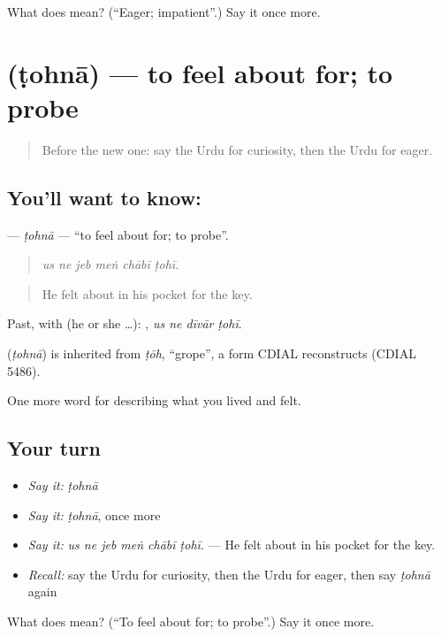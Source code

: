 \begin{tcolorbox}[breakable,colback=teal!4,colframe=teal!35!black,title={Before you move on}]
What does  mean? (\textquotedblleft{}Eager; impatient\textquotedblright{}.) Say it once more.
\end{tcolorbox}
\section[\texorpdfstring{\ur{ٹوہنا} (ṭohnā)}{ٹوہنا (ṭohnā)}]{ (ṭohnā) — to feel about for; to probe}

\label{lesson:UR-C448-tohna}



\begin{quote}
Before the new one: say the Urdu for curiosity, then the Urdu for eager.
\end{quote}

\subsection*{You'll want to know: }
\textbf{} — \emph{ṭohnā} — \textquotedblleft{}to feel about for; to probe\textquotedblright{}.

\begin{quote}
     
\end{quote}

\begin{quote}
\emph{us ne jeb meṅ chābī ṭohī.}
\end{quote}

\begin{quote}
He felt about in his pocket for the key.
\end{quote}

Past, with  (he or she …):    , \emph{us ne dīvār ṭohī}.

\begin{cousinweb}
\textbf{} (\emph{ṭohnā}) is inherited from \emph{ṭōh}, \textquotedblleft{}grope\textquotedblright{}, a form CDIAL reconstructs (CDIAL 5486).
\end{cousinweb}

\begin{grammarlens}[title={What you've built}]
One more word for describing what you lived and felt.
\end{grammarlens}

\subsection*{Your turn}
\begin{itemize}
\raggedright
  \item \emph{Say it:} \emph{ṭohnā}
  \item \emph{Say it:} \emph{ṭohnā}, once more
  \item \emph{Say it:} \emph{us ne jeb meṅ chābī ṭohī.} — He felt about in his pocket for the key.
  \item \emph{Recall:} say the Urdu for curiosity, then the Urdu for eager, then say \emph{ṭohnā} again
\end{itemize}

\begin{tcolorbox}[breakable,colback=teal!4,colframe=teal!35!black,title={Before you move on}]
What does  mean? (\textquotedblleft{}To feel about for; to probe\textquotedblright{}.) Say it once more.
\end{tcolorbox}
